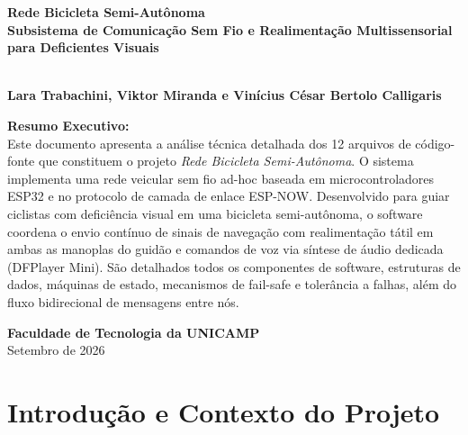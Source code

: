 \documentclass[12pt,a4paper]{article}
\begin{document}

\begin{titlepage}
    \centering
    \vspace*{1.5cm}
    {\Huge \textbf{\textcolor{primaryDark}{Rede Bicicleta Semi-Autônoma}}}\\[0.4cm]
    {\Large \textbf{Subsistema de Comunicação Sem Fio e Realimentação Multissensorial para Deficientes Visuais}}\\[1.5cm]
    
    \\[1.5cm]

    \textbf{Lara Trabachini, Viktor Miranda e Vinícius César Bertolo Calligaris}\\[2.5cm]

    \begin{minipage}{0.85\textwidth}
        \large
        \textbf{Resumo Executivo:}\\
        Este documento apresenta a análise técnica detalhada dos 12 arquivos de código-fonte que constituem o projeto \textit{Rede Bicicleta Semi-Autônoma}. O sistema implementa uma rede veicular sem fio ad-hoc baseada em microcontroladores ESP32 e no protocolo de camada de enlace ESP-NOW. Desenvolvido para guiar ciclistas com deficiência visual em uma bicicleta semi-autônoma, o software coordena o envio contínuo de sinais de navegação com realimentação tátil em ambas as manoplas do guidão e comandos de voz via síntese de áudio dedicada (DFPlayer Mini). São detalhados todos os componentes de software, estruturas de dados, máquinas de estado, mecanismos de fail-safe e tolerância a falhas, além do fluxo bidirecional de mensagens entre nós.
    \end{minipage}

    \vfill
    {\large \textbf{Faculdade de Tecnologia da UNICAMP}}\\
    {\large  Setembro de 2026}
\end{titlepage}

\tableofcontents
\newpage

\section{Introdução e Contexto do Projeto}
\end{document}
